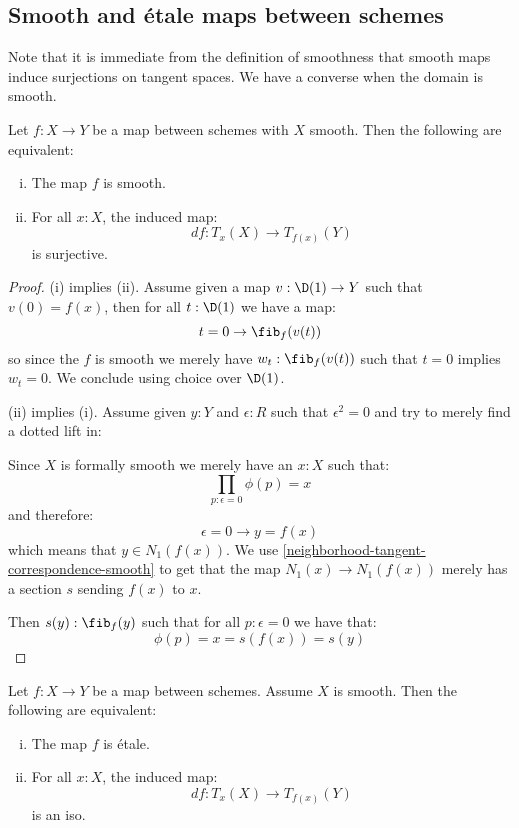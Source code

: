 \subsection{Smooth and étale maps between schemes}

Note that it is immediate from the definition of smoothness that smooth maps induce surjections on tangent spaces. We have a converse when the domain is smooth.

\begin{corollary}\label{smooth-schemes-iff-submersion}
Let $f:X\to Y$ be a map between schemes with $X$ smooth. Then the following are equivalent:
\begin{enumerate}[(i)] 
\item The map $f$ is smooth.
\item For all $x:X$, the induced map:
\[df : T_x(X)\to T_{f(x)}(Y)\]
is surjective.
\end{enumerate}
\end{corollary}

\begin{proof}
(i) implies (ii). Assume given a map $v:\D(1)\to Y$ such that $v(0)=f(x)$, then for all $t:\D(1)$ we have a map:
\[t=0 \to \fib_f(v(t))\]
so since the $f$ is smooth we merely have $w_t:\fib_f(v(t))$ such that $t=0$ implies $w_t=0$. We conclude using choice over $\D(1)$.

(ii) implies (i). Assume given $y:Y$ and $\epsilon:R$ such that $\epsilon^2=0$ and try to merely find a dotted lift in:
 \begin{center}
    \end{center}
    Since $X$ is formally smooth we merely have an $x:X$ such that:
\[\prod_{p:\epsilon=0} \phi(p)=x\]
and therefore:
\[ \epsilon=0 \to y=f(x)\]
which means that $y\in N_1(f(x))$. We use \cref{neighborhood-tangent-correspondence-smooth} to get that the map $N_1(x)\to N_1(f(x))$ merely has a section $s$ sending $f(x)$ to $x$.

Then $s(y):\fib_f(y)$ such that for all $p:\epsilon=0$ we have that:
\[\phi(p) = x = s(f(x)) = s(y)\]
\end{proof}

\begin{corollary}\label{etale-schemes-iff-local-iso}
Let $f:X\to Y$ be a map between schemes. Assume $X$ is smooth. Then the following are equivalent:
\begin{enumerate}[(i)]
\item The map $f$ is étale. 
\item For all $x:X$, the induced map:
\[df : T_x(X)\to T_{f(x)}(Y)\]
is an iso.
\end{enumerate}
\end{corollary}

